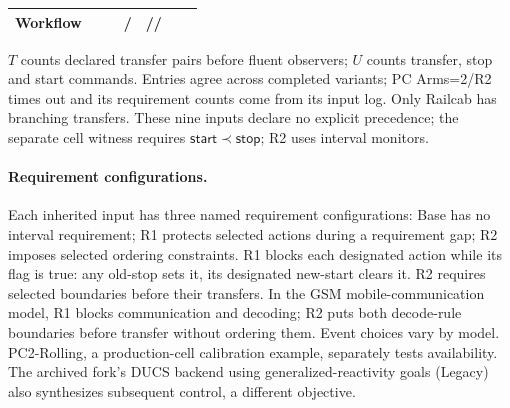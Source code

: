 \begin{table}[!htbp]
\begin{tabular}{@{}lrrrrrr@{}}
Workflow & \ContractWorkflowComponents{} & \FixedWorkflowEntries{} & \ContractWorkflowOld{}/\ContractWorkflowNew{} & \ContractWorkflowBase{}/\ContractWorkflowROne{}/\ContractWorkflowRTwo{} & \ContractWorkflowTransferPairs{} & \ContractWorkflowUpdates{}\\
\bottomrule\end{tabular}
\par\smallskip\footnotesize $T$ counts declared transfer pairs before fluent observers; $U$ counts transfer, stop and start commands. Entries agree across completed variants; PC Arms=2/R2 times out and its requirement counts come from its input log. Only Railcab has branching transfers. These nine inputs declare no explicit precedence; the separate cell witness requires $\mathsf{start}\prec\mathsf{stop}$; R2 uses interval monitors.
\end{table}


\paragraph{Requirement configurations.}
Each inherited input has three named requirement configurations: Base has no interval requirement; R1 protects selected actions during a requirement gap; R2 imposes selected ordering constraints. R1 blocks each designated action while its flag is true: any old-stop sets it, its designated new-start clears it. R2 requires selected boundaries before their transfers. In the GSM mobile-communication model, R1 blocks communication and decoding; R2 puts both decode-rule boundaries before transfer without ordering them. Event choices vary by model. PC2-Rolling, a production-cell calibration example, separately tests availability. The archived fork's DUCS backend using generalized-reactivity goals (Legacy) also synthesizes subsequent control, a different objective.
